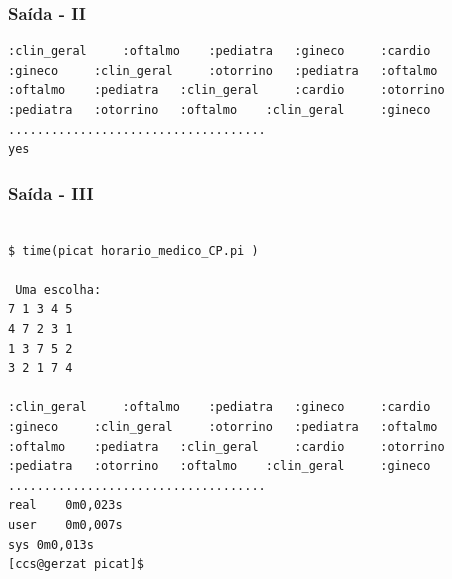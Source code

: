 
\begin{frame}[fragile]

\frametitle{Saída - II}

\begin{small}
\begin{verbatim}
:clin_geral 	:oftalmo 	:pediatra 	:gineco 	:cardio 	
:gineco 	:clin_geral 	:otorrino 	:pediatra 	:oftalmo 	
:oftalmo 	:pediatra 	:clin_geral 	:cardio 	:otorrino 	
:pediatra 	:otorrino 	:oftalmo 	:clin_geral 	:gineco 	
....................................
yes
\end{verbatim}
  
\end{small}
\end{frame}

\begin{frame}[fragile]

\frametitle{Saída - III}

\begin{small}
\begin{verbatim}

$ time(picat horario_medico_CP.pi )

 Uma escolha:
7 1 3 4 5 
4 7 2 3 1 
1 3 7 5 2 
3 2 1 7 4 

:clin_geral 	:oftalmo 	:pediatra 	:gineco 	:cardio 	
:gineco 	:clin_geral 	:otorrino 	:pediatra 	:oftalmo 	
:oftalmo 	:pediatra 	:clin_geral 	:cardio 	:otorrino 	
:pediatra 	:otorrino 	:oftalmo 	:clin_geral 	:gineco 	
....................................
real	0m0,023s
user	0m0,007s
sys	0m0,013s
[ccs@gerzat picat]$ 
\end{verbatim}
  
\end{small}
\end{frame}


